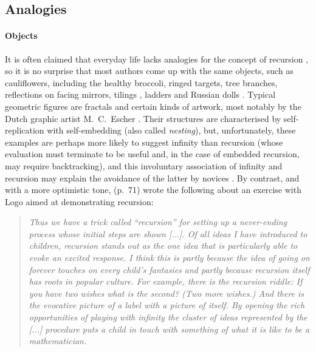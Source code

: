 \documentclass[11pt,a4paper]{article}
\newcommand\plang[1]{\textsf{#1}\xspace}
\begin{document}
\subsection{Analogies}
\label{analogies}

\paragraph{Objects}

It is often claimed that everyday life lacks analogies for the concept
of recursion \citep{PirolliAnderson:1985}, so it is no surprise that
most authors come up with the same objects, such as cauliflowers,
including the healthy broccoli, ringed targets, tree branches,
reflections on facing mirrors, tilings \citep{ChuJohnsonbaugh:1987},
ladders \citep{LevyLapidot:2002} and Russian dolls
\citep{BrewerSeagraves:1985}. Typical geometric figures are fractals
\citep{Riordon:1984c,ElenbogenOKennon:1988,Wakin:1989,BruceDanylukMurtagh:2005,Ammari:2005,Stephenson:2009a,Gordon:2006}
and certain kinds of artwork, most notably by the Dutch graphic artist
M.~C.~Escher \citep{GunionMilfordStege:2009b}. Their structures are
characterised by self\hyp{}replication with self\hyp{}embedding (also
called \emph{nesting}), but, unfortunately, these examples are perhaps
more likely to suggest infinity than recursion (whose evaluation must
terminate to be useful and, in the case of embedded recursion, may
require backtracking), and this involuntary association of infinity
and recursion may explain the avoidance of the latter by novices
\citep{Wiedenbeck:1989}. By contrast, and with a more optimistic tone,
\textcite{Papert:1980} (p.~71) wrote the following about an exercise
with \plang{Logo} aimed at demonstrating recursion:
\begin{quote}
\it Thus we have a trick called ``recursion'' for setting up a
never\hyp{}ending process whose initial steps are shown [...]. Of all
ideas I have introduced to children, recursion stands out as the one
idea that is particularly able to evoke an excited response. I think
this is partly because the idea of going on forever touches on every
child's fantasies and partly because recursion itself has roots in
popular culture. For example, there is the recursion riddle: If you
have two wishes what is the second? (Two more wishes.) And there is
the evocative picture of a label with a picture of itself. By opening
the rich opportunities of playing with infinity the cluster of ideas
represented by the [...] procedure puts a child in touch with
something of what it is like to be a mathematician.
\end{quote}
\end{document}
